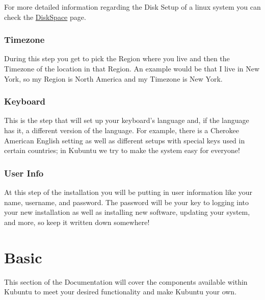 \documentclass[letterpaper,10pt,english]{sphinxmanual}
\begin{document}
For more detailed information regarding the Disk Setup of a linux system you can check the \href{https://help.ubuntu.com/community/DiskSpace}{DiskSpace} page.


\subsection{Timezone}
\label{\detokenize{docs/installation:timezone}}
During this step you get to pick the Region where you live and then the Timezone of the location in that Region. An example would be that I live in New York, so my Region is North America and my Timezone is New York.



\subsection{Keyboard}
\label{\detokenize{docs/installation:keyboard}}
This is the step that will set up your keyboard's language and, if the language has it, a different version of the language. For example, there is a Cherokee American English setting as well as different setups with special keys used in certain countries; in Kubuntu we try to make the system easy for everyone!



\subsection{User Info}
\label{\detokenize{docs/installation:user-info}}
At this step of the installation you will be putting in user information like your name, username, and password. The password will be your key to logging into your new installation as well as installing new software, updating your system, and more, so keep it written down somewhere!



\chapter{Basic}
\label{\detokenize{docs/basic::doc}}\label{\detokenize{docs/basic:basic-link}}\label{\detokenize{docs/basic:basic}}
This section of the Documentation will cover the components available within Kubuntu to meet your desired functionality and make Kubuntu your own.
\end{document}
